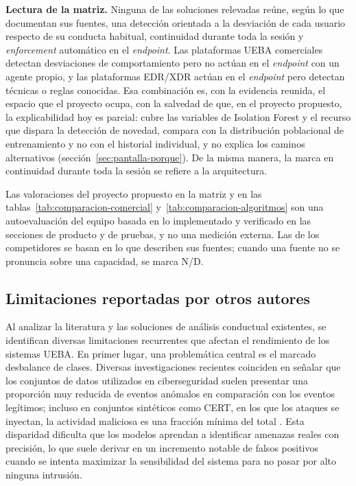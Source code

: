 \textbf{Lectura de la matriz.} Ninguna de las soluciones relevadas reúne, según lo que documentan sus fuentes, una detección orientada a la desviación de cada usuario respecto de su conducta habitual, continuidad durante toda la sesión y \emph{enforcement} automático en el \emph{endpoint}. Las plataformas UEBA comerciales detectan desviaciones de comportamiento pero no actúan en el \emph{endpoint} con un agente propio, y las plataformas EDR/XDR actúan en el \emph{endpoint} pero detectan técnicas o reglas conocidas. Esa combinación es, con la evidencia reunida, el espacio que el proyecto ocupa, con la salvedad de que, en el proyecto propuesto, la explicabilidad hoy es parcial: cubre las variables de Isolation Forest y el recurso que dispara la detección de novedad, compara con la distribución poblacional de entrenamiento y no con el historial individual, y no explica los caminos alternativos (sección~\ref{sec:pantalla-porque}). De la misma manera, la marca \checkmark en continuidad durante toda la sesión se refiere a la arquitectura.

Las valoraciones del proyecto propuesto en la matriz y en las tablas~\ref{tab:comparacion-comercial} y~\ref{tab:comparacion-algoritmos} son una autoevaluación del equipo basada en lo implementado y verificado en las secciones de producto y de pruebas, y no una medición externa. Las de los competidores se basan en lo que describen sus fuentes; cuando una fuente no se pronuncia sobre una capacidad, se marca N/D.

\subsection{Limitaciones reportadas por otros autores}
Al analizar la literatura y las soluciones de análisis conductual existentes, se identifican diversas limitaciones recurrentes que afectan el rendimiento de los sistemas UEBA. En primer lugar, una problemática central es el marcado desbalance de clases. Diversas investigaciones recientes \parencite{Artioli2024, VillarrealVasquez2021, Sharma2020} coinciden en señalar que los conjuntos de datos utilizados en ciberseguridad suelen presentar una proporción muy reducida de eventos anómalos en comparación con los eventos legítimos; incluso en conjuntos sintéticos como CERT, en los que los ataques se inyectan, la actividad maliciosa es una fracción mínima del total \parencite{Sharma2020}. Esta disparidad dificulta que los modelos aprendan a identificar amenazas reales con precisión, lo que suele derivar en un incremento notable de falsos positivos cuando se intenta maximizar la sensibilidad del sistema para no pasar por alto ninguna intrusión.

